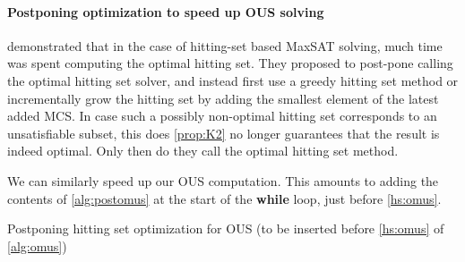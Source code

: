 \paragraph{Postponing optimization to speed up OUS solving}
\citet{davies} demonstrated that in the case of hitting-set based MaxSAT solving, much time was spent computing the optimal hitting set. They proposed to post-pone calling the optimal hitting set solver, and instead first use a greedy hitting set method or incrementally grow the hitting set by adding the smallest element of the latest added MCS. 
In case such a possibly non-optimal hitting set corresponds to an unsatisfiable subset, this does \ref{prop:K2} no longer guarantees that the result is indeed optimal. Only then do they call the optimal hitting set method.

We can similarly speed up our OUS computation. This amounts to adding the contents of \cref{alg:postomus} at the start of the \textbf{while} loop, just before \cref{hs:omus}.
\begin{algorithm}[ht]
\caption{Postponing hitting set optimization for OUS (to be inserted before \cref{hs:omus} of \cref{alg:omus})}\label{alg:postomus}
\end{algorithm}


% 


